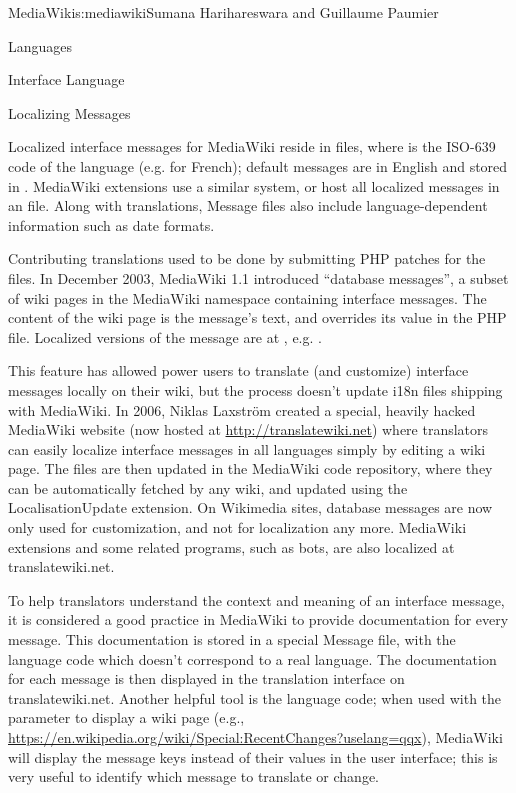 \begin{aosachapter}{MediaWiki}{s:mediawiki}{Sumana Harihareswara and Guillaume Paumier}
\begin{aosasect1}{Languages}
\begin{aosasect2}{Interface Language}
\end{aosasect2}

\begin{aosasect2}{Localizing Messages}

Localized interface messages for MediaWiki reside in
 files, where  is the ISO-639 code of
the language (e.g.  for French); default messages
are in English and stored in . MediaWiki
extensions use a similar system, or host all localized messages in an
 file. Along
with translations, Message files also include language-dependent
information such as date formats.

Contributing translations used to be done by submitting PHP patches
for the  files. In December 2003, MediaWiki 1.1
introduced ``database messages'', a subset of wiki pages in the
MediaWiki namespace containing interface messages. The content of the
wiki page  is the
message's text, and overrides its value in the PHP file. Localized
versions of the message are at
,
e.g. .

This feature has allowed power users to translate (and customize)
interface messages locally on their wiki, but the process doesn't
update i18n files shipping with MediaWiki. In 2006, Niklas Laxstr\"{o}m
created a special, heavily hacked MediaWiki website (now hosted at
\url{http://translatewiki.net}) where translators can easily localize
interface messages in all languages simply by editing a wiki
page. The  files are then updated in the
MediaWiki code repository, where they can be automatically fetched by
any wiki, and updated using the LocalisationUpdate extension. On
Wikimedia sites, database messages are now only used for
customization, and not for localization any more. MediaWiki extensions
and some related programs, such as bots, are also localized at
translatewiki.net.

To help translators understand the context and meaning of an interface
message, it is considered a good practice in MediaWiki to provide
documentation for every message. This documentation is stored in a
special Message file, with the  language code which doesn't
correspond to a real language. The documentation for each message is
then displayed in the translation interface on
translatewiki.net. Another helpful tool is the  language
code; when used with the  parameter to display a
wiki page (e.g.,
\url{https://en.wikipedia.org/wiki/Special:RecentChanges?uselang=qqx}),
MediaWiki will display the message keys instead of their values in the
user interface; this is very useful to identify which message to
translate or change.


\end{aosasect2}
\end{aosasect1}
\end{aosachapter}
